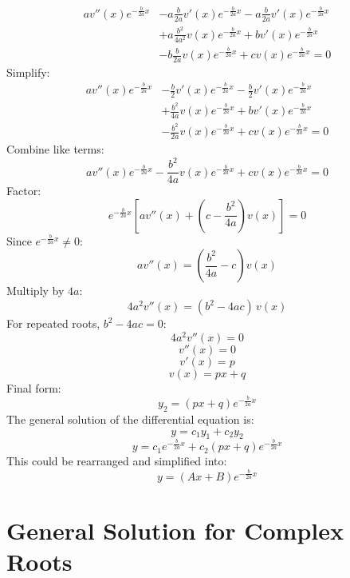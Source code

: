 \documentclass{article}
\begin{document}
\begin{equation}
\begin{split}
    av''(x)e^{-\frac{b}{2a}x}
    &- a\frac{b}{2a}v'(x)e^{-\frac{b}{2a}x}
    - a\frac{b}{2a}v'(x)e^{-\frac{b}{2a}x} \\
    &+ a\frac{b^2}{4a^2}v(x)e^{-\frac{b}{2a}x}
    + bv'(x)e^{-\frac{b}{2a}x} \\
    &- b\frac{b}{2a} v(x)e^{-\frac{b}{2a}x}
    + c v(x)e^{-\frac{b}{2a}x}
    = 0
\end{split}
\end{equation}
Simplify:
\[
\begin{split}
    av''(x)e^{-\frac{b}{2a}x}
    &-\frac{b}{2}v'(x)e^{-\frac{b}{2a}x}
    -\frac{b}{2}v'(x)e^{-\frac{b}{2a}x}\\
    &+\frac{b^2}{4a}v(x)e^{-\frac{b}{2a}x}
    +bv'(x)e^{-\frac{b}{2a}x}\\
    &-\frac{b^2}{2a} v(x)e^{-\frac{b}{2a}x}
    + cv(x)e^{-\frac{b}{2a}x}
    = 0
\end{split}
\]
Combine like terms:
\[
    av''(x)e^{-\frac{b}{2a}x}
    -\frac{b^2}{4a}v(x)e^{-\frac{b}{2a}x}
    + cv(x)e^{-\frac{b}{2a}x}
    = 0
\]
Factor:
\begin{equation}
    e^{-\frac{b}{2a}x}
    \left[
    a v''(x)
    + \left(c - \frac{b^2}{4a}\right)v(x)
    \right]
    = 0
\end{equation}
Since $e^{-\frac{b}{2a}x}\neq 0$:
\begin{equation}
    a v''(x)
    = \left(\frac{b^2}{4a} - c\right)v(x)
\end{equation}
Multiply by $4a$:
$$
4a^2 v''(x) = (b^2 - 4ac)\, v(x)
$$
For repeated roots, $b^2 - 4ac = 0$:
$$
4a^2 v''(x) = 0
$$
$$
v''(x) = 0
$$
$$
v'(x) = p
$$
\begin{equation}
    v(x) = px + q
\end{equation}
Final form:
\begin{equation}
y_2 = (px + q)e^{-\frac{b}{2a}x}
\end{equation}
The general solution of the differential equation is: 
$$
y = c_1y_1+c_2y_2 
$$
$$y=c_1e^{-\frac{b}{2a}x} + c_2(px+q)e^{-\frac{b}{2a}x}$$
This could be rearranged and simplified into: 
\begin{equation}
    y = (Ax+B)e^{-\frac{b}{2a}x}
\end{equation}

\newpage

\section{General Solution for Complex Roots}
\end{document}
